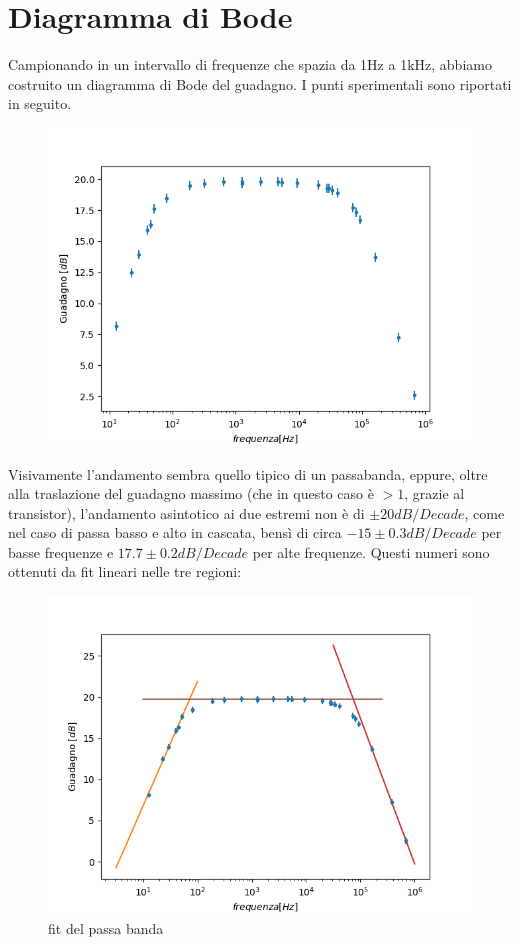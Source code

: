 \documentclass[10pt,a4paper]{article}
\begin{document}
\section{Diagramma di Bode}
 Campionando in un intervallo di frequenze che spazia da 1\si{\hertz} a 1\si{\kilo\hertz}, abbiamo costruito un diagramma di Bode del guadagno. I punti sperimentali sono riportati in seguito.
 \begin{figure}[h]
 	\centering
 	\includegraphics[scale=0.5]{dataBodeplot.png}
	
	
\end{figure}
Visivamente l'andamento sembra quello tipico di un passabanda, eppure, oltre alla traslazione del guadagno massimo (che in questo caso è $> 1$, grazie al transistor), l'andamento asintotico ai due estremi non è di $\pm 20 dB/Decade$, come nel caso di passa basso e alto in cascata, bensì di circa $-15 \pm0.3dB/Decade $ per basse frequenze e $ 17.7\pm0.2 dB/Decade$ per alte frequenze.
Questi numeri sono ottenuti da fit lineari nelle tre regioni:
\begin{figure}[h]
	\centering
	\includegraphics[scale=1]{fit.png}
	\caption{fit del passa banda}
\end{figure}
\end{document}
